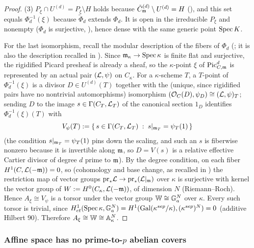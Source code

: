 \begin{proof}
    (3) $P_\xi \cap U^{(d)} = P_\xi \setminus H$ holds because
    $\Cmod{d} \setminus U^{(d)} = H$ (), and
    this set equals $\Phi_d^{-1}(\xi)$ because $\tilde{\Phi}_d$ extends $\Phi_d$. It is open
    in the irreducible $P_\xi$ and nonempty ($\Phi_d$ is surjective,
    ), hence dense with the same generic point $\Spec K$.

    For the last isomorphism, recall the modular description of the fibers of $\Phi_d$
    (\cite[Section 4, proof of Theorem 4.14]{Guignard2018}; it is also the description
    recalled in ). Since $\mdls_\kappa \to \Spec \kappa$ is finite
    flat and surjective, the rigidified Picard presheaf is already a sheaf, so the
    $\kappa$-point $\xi$ of $\PicCm[d]$ is represented by an actual pair $(\cL, \psi)$ on
    $C_\kappa$. For a $\kappa$-scheme $T$, a $T$-point of $\Phi_d^{-1}(\xi)$ is a divisor
    $D \in U^{(d)}(T)$ together with the (unique, since rigidified pairs have no nontrivial
    automorphisms) isomorphism $(\Oo_C(D), \psi_D) \cong (\cL, \psi)_T$; sending $D$ to the
    image $s \in \Gamma(C_T, \cL_T)$ of the canonical section $1_D$ identifies
    $\Phi_d^{-1}(\xi)(T)$ with
    \[
    V_\psi(T) := \{\, s \in \Gamma(C_T, \cL_T) \;:\; s|_{\mdls_T} = \psi_T(1) \,\}
    \]
    (the condition $s|_{\mdls_T} = \psi_T(1)$ pins down the scaling, and such an $s$ is
    fiberwise nonzero because it is invertible along $\mdls$, so $D = V(s)$ is a relative
    effective Cartier divisor of degree $d$ prime to $\mdls$). By the degree condition, on
    each fiber $H^1(C, \cL(-\mdls)) = 0$, so (cohomology and base change, as recalled in
    ) the restriction map of vector groups
    $\mathrm{pr}_*\cL \to \mathrm{pr}_*(\cL|_{\mdls})$ over $\kappa$ is surjective with
    kernel the vector group of $W := H^0(C_\kappa, \cL(-\mdls))$, of dimension $N$
    (Riemann--Roch). Hence $A_\xi \cong V_\psi$ is a torsor under the vector group
    $\mathbb{W} \cong \bG_a^N$ over $\kappa$. Every such torsor is trivial, since
    $H^1_{et}(\Spec \kappa, \bG_a^N) = H^1(\mathrm{Gal}(\kappa^{sep}/\kappa),
    (\kappa^{sep})^N) = 0$ (additive Hilbert 90). Therefore
    $A_\xi \cong \mathbb{W} \cong \A^N_\kappa$.
\end{proof}

\subsubsection*{Affine space has no prime-to-$p$ abelian covers}

